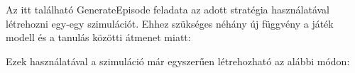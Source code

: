 \documentclass[12pt]{article}
\begin{document}
	Az itt található GenerateEpisode feladata az adott stratégia használatával létrehozni egy-egy szimulációt. Ehhez szükséges néhány új függvény a játék modell és a tanulás közötti átmenet miatt:
	
	\vspace{1cm}
	\noindent{}
	\vspace{1.5 em}
	
	Ezek használatával a szimuláció már egyszerűen létrehozható az alábbi módon:
	
\end{document}

